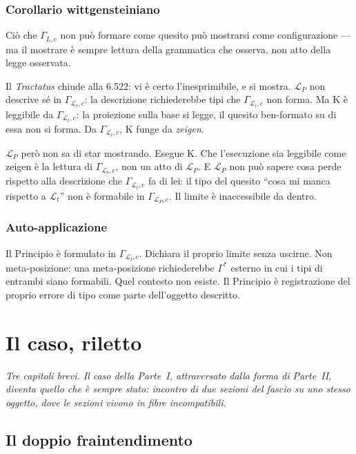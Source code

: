 \documentclass[
    oneside,                 %
    openany,                 %
    titlepage,
    11pt,
    a4paper,
    italian,
    DIV=14,                  %
    headinclude,
    footinclude=true,
    cleardoublepage=empty
]{scrbook}
\theoremstyle{ctplain}
\theoremstyle{ctdef}
\theoremstyle{ctrem}
\newcommand{\Lt}{\mathcal{L}_t}
\newcommand{\LP}{\mathcal{L}_P}
\newcommand{\Kappaa}{\mathrm{K}}
\begin{document}
\section*{Corollario wittgensteiniano}

Ciò che $\Gamma_{L,c}$ non può formare come quesito può mostrarsi come configurazione --- ma il mostrare è sempre lettura della grammatica che osserva, non atto della legge osservata.

Il \emph{Tractatus} chiude alla 6.522: vi è certo l'inesprimibile, e si mostra. $\LP$ non descrive sé in $\Gamma_{\Lt,c}$: la descrizione richiederebbe tipi che $\Gamma_{\Lt,c}$ non forma. Ma $\Kappaa$ è leggibile da $\Gamma_{\Lt,c}$: la proiezione sulla base si legge, il quesito ben-formato su di essa non si forma. Da $\Gamma_{\Lt,c}$, $\Kappaa$ funge da \emph{zeigen}.

$\LP$ però non sa di star mostrando. Esegue $\Kappaa$. Che l'esecuzione sia leggibile come zeigen è la lettura di $\Gamma_{\Lt,c}$, non un atto di $\LP$. E $\LP$ non può sapere cosa perde rispetto alla descrizione che $\Gamma_{\Lt,c}$ fa di lei: il tipo del quesito ``cosa mi manca rispetto a $\Lt$'' non è formabile in $\Gamma_{\LP,c}$. Il limite è inaccessibile da dentro.

\section*{Auto-applicazione}

Il Principio è formulato in $\Gamma_{\Lt,c}$. Dichiara il proprio limite senza uscirne. Non meta-posizione: una meta-posizione richiederebbe $\Gamma^{*}$ esterno in cui i tipi di entrambi siano formabili. Quel contesto non esiste. Il Principio è registrazione del proprio errore di tipo come parte dell'oggetto descritto.

\part{Il caso, riletto}

\noindent\itshape Tre capitoli brevi. Il caso della Parte~I, attraversato dalla forma di Parte~II, diventa quello che è sempre stato: incontro di due sezioni del fascio su uno stesso oggetto, dove le sezioni vivono in fibre incompatibili.\upshape

\bigskip

\chapter{Il doppio fraintendimento}
\end{document}
